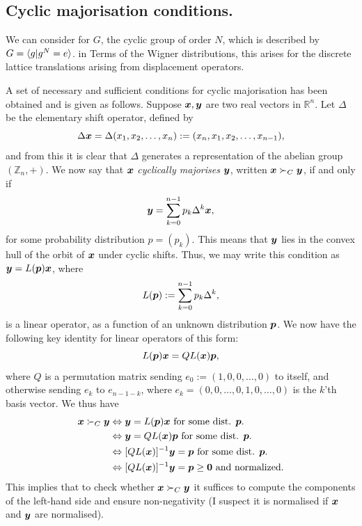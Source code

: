 \documentclass[pra,
aps,
twocolumn,
superscriptaddress,
groupedaddress,
nofootinbib,
reprint
]{revtex4-1}
\begin{document}
\subsection{Cyclic majorisation conditions.}
We can consider for $G$, the cyclic group of order $N$, which is described by $G= \langle g | g^N = e\rangle$. in Terms of the Wigner distributions, this arises for the discrete lattice translations arising from displacement operators.

A set of necessary and sufficient conditions for cyclic majorisation has been obtained and is given as follows. Suppose $\boldsymbol{x}, \boldsymbol{y}$ are two real vectors in $\mathbb{R}^n$. Let $\Delta$ be the elementary shift operator, defined by
\begin{equation}
\Delta \boldsymbol{x} = \Delta (x_1, x_2, \dots, x_n) := (x_n, x_1, x_2, \dots, x_{n-1}),
\end{equation}
and from this it is clear that $\Delta$ generates a representation of the abelian group $(\mathbb{Z}_n,+)$.
We now say that $\boldsymbol{x}$ \emph{cyclically majorises} $\boldsymbol{y}$, written $\boldsymbol{x} \succ_C \boldsymbol{y}$, if and only if 
\begin{equation}
\boldsymbol{y} = \sum_{k=0}^{n-1} p_k \Delta^k \boldsymbol{x},
\end{equation}
for some probability distribution $p=(p_k)$. This means that $\boldsymbol{y}$ lies in the convex hull of the orbit of $\boldsymbol{x}$ under cyclic shifts. Thus, we may write this condition as $\boldsymbol{y} = L(\boldsymbol{p}) \boldsymbol{x}$, where
\begin{equation}
L(\boldsymbol{p}) :=  \sum_{k=0}^{n-1} p_k \Delta^k,
\end{equation}
is a linear operator, as a function of an unknown distribution $\boldsymbol{p}$. We now have the following key identity for linear operators of this form:
\begin{equation}
L(\boldsymbol{p})\boldsymbol{x} = QL(\boldsymbol{x}) \boldsymbol{p},
\end{equation}
where $Q$ is a permutation matrix sending $e_0:=(1,0,0,\dots ,0)$ to itself, and otherwise sending $e_k$ to $e_{n-1-k}$, where $e_k=  (0,0,\dots, 0,1,0,\dots, 0)$ is the $k$'th basis vector. We thus have
\begin{align}
\boldsymbol{x} \succ_C \boldsymbol{y} &\Leftrightarrow \boldsymbol{y} = L(\boldsymbol{p}) \boldsymbol{x} \mbox{ for some dist. } \boldsymbol{p}. \nonumber \\
&\Leftrightarrow \boldsymbol{y} = QL(\boldsymbol{x}) \boldsymbol{p} \mbox{ for some dist. } \boldsymbol{p}. \nonumber \\
&\Leftrightarrow [QL(\boldsymbol{x})]^{-1}\boldsymbol{y} = \boldsymbol{p} \mbox{ for some dist. } \boldsymbol{p}. \nonumber \\
&\Leftrightarrow [QL(\boldsymbol{x})]^{-1}\boldsymbol{y} = \boldsymbol{p}  \ge \mathbf{0} \mbox{ and normalized}.
\end{align}
This implies that to check whether $\boldsymbol{x} \succ_C \boldsymbol{y}$ it suffices to compute the components of the left-hand side and ensure non-negativity (I suspect it is normalised if $\boldsymbol{x}$ and $\boldsymbol{y}$ are normalised).
\end{document}
